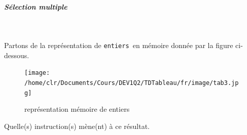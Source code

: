 \documentclass[11pt,a4paper]{article}
\begin{document}
			
		\subparagraph{S\'election multiple} 
		
                \textcolor{white}{.} \par
            
								Partons de la repr\'esentation de \verb|entiers |en m\'emoire
								donn\'ee par la figure ci-dessous.  
							\begin{figure}[hbt]
				    \begin{center}
					\texttt{[image: /home/clr/Documents/Cours/DEV1Q2/TDTableau/fr/image/tab3.jpg]}
						\end{center}
                
                    \caption[repr\'esentation m\'emoire de entiers]{repr\'esentation m\'emoire de entiers}
                \end{figure}
                    
            \par
        
								Quelle(s) instruction(s) m\`ene(nt) \`a ce r\'esultat.   
							
            \par
        
\end{document}

